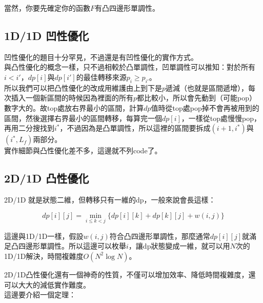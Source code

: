 	當然，你要先確定你的函數$F$有凸四邊形單調性。
	
	\subsection{1D/1D 凹性優化}
	
	凹性優化的題目十分罕見，不過還是有凹性優化的實作方式。\\
	
	與凸性優化的概念一樣，只不過相較於凸單調性，凹單調性可以推知：對於所有$i < i'$，$dp[i]$與$dp[i']$的最佳轉移來源$p_i \geq p_{i'}$。\\
	
	所以我們可以把凸性優化的改成用維護由上到下是$p$遞減（也就是區間遞增），每次插入一個新區間的時候因為裡面的所有$p$都比較小，所以會先動到（可能pop）數字大的。故top處放右界最小的區間，計算$dp$值時從top處pop掉不會再被用到的區間，然後選擇右界最小的區間轉移，每算完一個$dp[i]$，一樣從top處慢慢pop，再用二分搜找到$i^*$，不過因為是凸單調性，所以這裡的區間要拆成$(i+1, i^*)$與$(i^*, L_f)$兩部分。\\
	
	實作細節與凸性優化差不多，這邊就不列code了。
	
	\subsection{2D/1D 凸性優化}
	
	2D/1D 就是狀態二維，但轉移只有一維的dp，一般來說會長這樣：
	
	\begin{displaymath}
	dp[i][j] = \min\limits_{i\leq k < j} \{ dp[i][k] + dp[k][j] + w(i, j) \}
	\end{displaymath}
	
	這邊與1D/1D一樣，假設$w(i, j)$符合凸四邊形單調性，那麼通常$dp[i][j]$就滿足凸四邊形單調性。所以這邊可以枚舉$i$，讓dp狀態變成一維，就可以用$N$次的1D/1D解決，時間複雜度$O(N^2\log N)$。\\
	
	
	2D/1D凸性優化還有一個神奇的性質，不僅可以增加效率、降低時間複雜度，還可以大大的減低實作難度。\\
	
	這邊要介紹一個定理：\\
	
	
